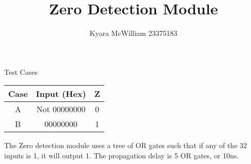 \documentclass{article}
\title{Zero Detection Module}
\author{Kyara McWilliam 23375183}
\date{}
\begin{document}
\maketitle

Test Cases
\hfill \break

\begin{tabular}{ |c|c|c| }
\hline
Case & Input (Hex) & Z \\
\hline
A & Not 00000000 & 0 \\
B & 00000000 & 1 \\
\hline
\end{tabular}
\hfill \break \break
The Zero detection module uses a tree of OR gates such that if any of the 32 inputs is 1, it will output 1. The propagation delay is 5 OR gates, or 10ns.
\end{document}
